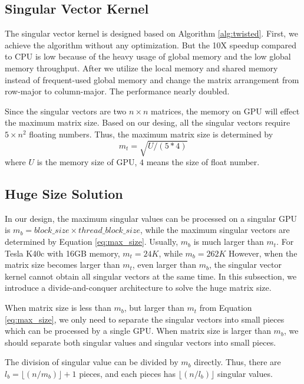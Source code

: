 \subsection{Singular Vector Kernel}
The singular vector kernel is designed based on Algorithm \ref{alg:twisted}.
First, we achieve the algorithm without any optimization.
But the 10X speedup compared to CPU is low because of the heavy usage of global memory and the low global memory throughput.
After we utilize the local memory and shared memory instead of frequent-used global memory and change the matrix arrangement from row-major to column-major.
The performance nearly doubled.

Since the singular vectors are two $n\times n$ matrices, the memory on GPU will effect the maximum matrix size.
Based on our desing, all the singular vectors require $5\times n^2$ floating numbers.
Thus, the maximum matrix size is determined by
\begin{equation}
m_t = \sqrt{U / (5 * 4)}
\label{eq:max_size}
\end{equation}
where $U$ is the memory size of GPU, $4$ means the size of float number.

\subsection{Huge Size Solution}
In our design, the maximum singular values can be processed on a singular GPU is $m_b = block\_size \times thread\_block\_size$,
while the maximum singular vectors are determined by Equation \ref{eq:max_size}.
Usually, $m_b$ is much larger than $m_t$.
For Tesla K40c with 16GB memory, $m_t = 24K$, while $m_b = 262K$
However, when the matrix size becomes larger than $m_t$, even larger than $m_b$,
the singular vector kernel cannot obtain all singular vectors at the same time.
In this subsection, we introduce a divide-and-conquer architecture to solve the huge matrix size.

When matrix size is less than $m_b$, but larger than $m_t$ from Equation \ref{eq:max_size},
we only need to separate the singular vectors into small pieces which can be processed by a single GPU.
When matrix size is larger than $m_b$, we should separate both singular values and singular vectors into small pieces.

The division of singular value can be divided by $m_b$ directly.
Thus, there are $l_b = \lfloor(n/m_b)\rfloor + 1$ pieces, and each pieces has $\lfloor(n/l_b)\rfloor$ singular values.

